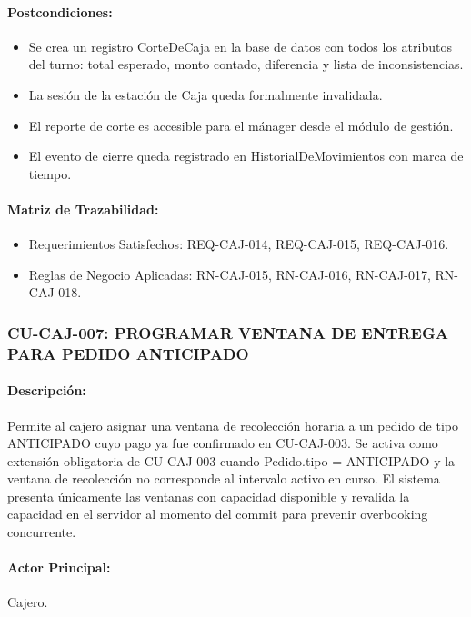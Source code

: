 \paragraph{Postcondiciones:}
\begin{itemize}
    \item Se crea un registro CorteDeCaja en la base de datos con todos los atributos del turno: total esperado, monto contado, diferencia y lista de inconsistencias.
    \item La sesión de la estación de Caja queda formalmente invalidada.
    \item El reporte de corte es accesible para el mánager desde el módulo de gestión.
    \item El evento de cierre queda registrado en HistorialDeMovimientos con marca de tiempo.
\end{itemize}

\paragraph{Matriz de Trazabilidad:}
\begin{itemize}
    \item Requerimientos Satisfechos: REQ-CAJ-014, REQ-CAJ-015, REQ-CAJ-016.
    \item Reglas de Negocio Aplicadas: RN-CAJ-015, RN-CAJ-016, RN-CAJ-017, RN-CAJ-018.
\end{itemize}

\subsubsection{CU-CAJ-007: PROGRAMAR VENTANA DE ENTREGA PARA PEDIDO ANTICIPADO}
\paragraph{Descripción:} Permite al cajero asignar una ventana de recolección horaria a un pedido de tipo ANTICIPADO cuyo pago ya fue confirmado en CU-CAJ-003. Se activa como extensión obligatoria de CU-CAJ-003 cuando Pedido.tipo = ANTICIPADO y la ventana de recolección no corresponde al intervalo activo en curso. El sistema presenta únicamente las ventanas con capacidad disponible y revalida la capacidad en el servidor al momento del commit para prevenir overbooking concurrente.

\paragraph{Actor Principal:} Cajero.


